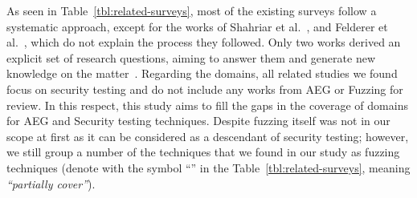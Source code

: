 As seen in Table~\ref{tbl:related-surveys}, most of the existing surveys follow a systematic approach, except for the works of Shahriar et al.~\cite{shahriar2009automatic}, and Felderer et al.~\cite{felderer2016security}, which do not explain the process they followed.
Only two works derived an explicit set of research questions, aiming to answer them and generate new knowledge on the matter~\cite{aydos2022security, ahsan2024systematic}.
{}
{}
Regarding the domains, all related studies we found focus on security testing and do not include any works from AEG or Fuzzing for review. 
%
In this respect, this study aims to fill the gaps in the coverage of domains for AEG and Security testing techniques.
{}
{}
Despite fuzzing itself was not in our scope at first as it can be considered as a descendant of security testing; however, we still group a number of the techniques that we found in our study as fuzzing techniques (denote with the symbol ``'' in the Table~\ref{tbl:related-surveys}, meaning \textit{``partially cover''}).